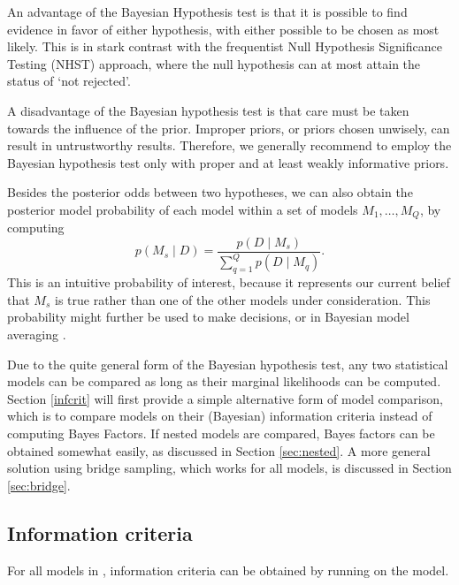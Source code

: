 An advantage of the Bayesian Hypothesis test is that it is possible to
find evidence in favor of either hypothesis, with either possible to be
chosen as most likely. This is in stark contrast with the frequentist
Null Hypothesis Significance Testing (NHST) approach, where the null
hypothesis can at most attain the status of `not rejected'.

A disadvantage of the Bayesian hypothesis test is that care must be
taken towards the influence of the prior. Improper priors, or priors
chosen unwisely, can result in untrustworthy results. Therefore, we
generally recommend to employ the Bayesian hypothesis test only with
proper and at least weakly informative priors.

Besides the posterior odds between two hypotheses, we can also obtain
the posterior model probability of each model within a set of models
\(M_1, \dots, M_Q\), by computing \begin{equation}
p(M_s \mid D) = \frac{p(D \mid M_s)}{\sum_{q = 1}^Q p(D \mid M_q)}.
\end{equation} This is an intuitive probability of interest, because it
represents our current belief that \(M_s\) is true rather than one of
the other models under consideration. This probability might further be
used to make decisions, or in Bayesian model averaging
\citep{hoeting1999bayesian, bao2010bias}.

Due to the quite general form of the Bayesian hypothesis test, any two
statistical models can be compared as long as their marginal likelihoods
can be computed. Section \ref{infcrit} will first provide a simple
alternative form of model comparison, which is to compare models on
their (Bayesian) information criteria \citep[Ch. 7]{gelman2003bayesian}
instead of computing Bayes Factors. If nested models are compared, Bayes
factors can be obtained somewhat easily, as discussed in Section
\ref{sec:nested}. A more general solution using bridge sampling, which
works for all models, is discussed in Section \ref{sec:bridge}.

\hypertarget{information-criteria}{%
\subsection{Information criteria}\label{information-criteria}}

\label{infcrit}

For all models in , information criteria can be obtained
by running  on the model.


